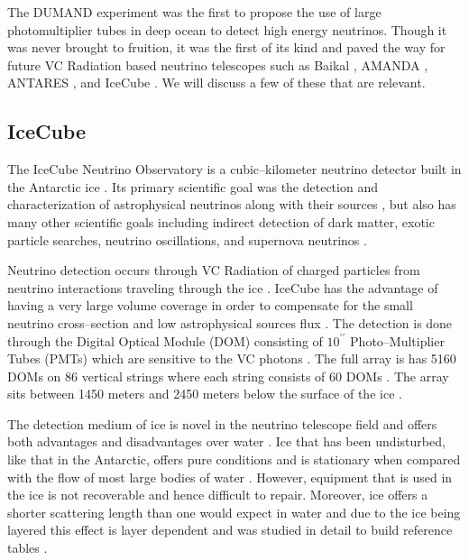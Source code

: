 The DUMAND experiment \cite{dumand} was the first to propose the use of large photomultiplier tubes in deep ocean to detect high energy neutrinos. Though it was never brought to fruition, it was the first of its kind and paved the way for future VC Radiation based neutrino telescopes such as Baikal \cite{baikal}, AMANDA \cite{amanda}, ANTARES \cite{antares}, and IceCube \cite{icecube}. We will discuss a few of these that are relevant. 

\subsection{IceCube}

The IceCube Neutrino Observatory is a cubic--kilometer neutrino detector built in the Antarctic ice \cite{icecube}. Its primary scientific goal was the detection and characterization of astrophysical neutrinos along with their sources \cite{icecube}, but also has many other scientific goals including indirect detection of dark matter, exotic particle searches, neutrino oscillations, and supernova neutrinos \cite{icecube}.

Neutrino detection occurs through VC Radiation of charged particles from neutrino interactions traveling through the ice \cite{icecube}. IceCube has the advantage of having a very large volume coverage in order to compensate for the small neutrino cross--section and low astrophysical sources flux \cite{icecube}. The detection is done through the Digital Optical Module (DOM) consisting of $10^{\prime\prime}$ Photo--Multiplier Tubes (PMTs) which are sensitive to the VC photons \cite{icecube}. The full array is has 5160 DOMs on 86 vertical strings where each string consists of 60 DOMs \cite{icecube}. The array sits between 1450 meters and 2450 meters below the surface of the ice \cite{icecube}.

The detection medium of ice is novel in the neutrino telescope field and offers both advantages and disadvantages over water \cite{icecube_rad}. Ice that has been undisturbed, like that in the Antarctic, offers pure conditions and is stationary when compared with the flow of most large bodies of water \cite{icecube_rad}. However, equipment that is used in the ice is not recoverable \cite{icecube_rad} and hence difficult to repair. Moreover, ice offers a shorter scattering length than one would expect in water \cite{icecube_rad} and due to the ice being layered this effect is layer dependent and was studied in detail to build reference tables \cite{icecube_rad}.

